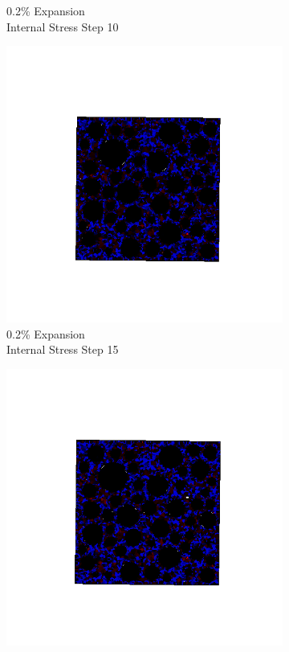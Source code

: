 \begin{figure}[ht!]
\begin{subfigure}{.25\textwidth}
      \caption{0.2\% Expansion\\Internal Stress Step 10}
    \end{subfigure}%
    \begin{subfigure}{.25\textwidth}
      \centering
      \includegraphics[width=1.0\linewidth]{Files/exp_3D/DEF/A30X-1C_1_s15.png}
      \caption{0.2\% Expansion\\Internal Stress Step 15}
    \end{subfigure}%
    \begin{subfigure}{.25\textwidth}
      \centering
      \includegraphics[width=1.0\linewidth]{Files/exp_3D/DEF/A30X-1C_1_stress.png}

\end{subfigure}
\end{figure}

